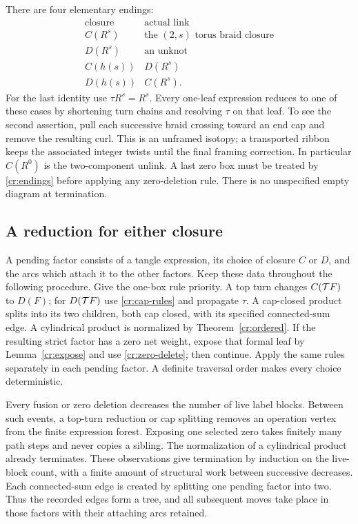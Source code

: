 There are four elementary endings:
\begin{equation}\label{cr:endings}
\begin{array}{c|c}
\text{closure}&\text{actual link}\\\hline
C(R^s)&\text{the }(2,s)\text{ torus braid closure}\\
D(R^s)&\text{an unknot}\\
C(h(s))&D(R^s)\\
D(h(s))&C(R^s).
\end{array}
\end{equation}
For the last identity use $\tau R^s=R^s$. Every one-leaf expression reduces to one of these cases by shortening turn chains and resolving $\tau$ on that leaf. To see the second assertion, pull each successive braid crossing toward an end cap and remove the resulting curl. This is an unframed isotopy; a transported ribbon keeps the associated integer twists until the final framing correction. In particular $C(R^0)$ is the two-component unlink. A last zero box must be treated by \eqref{cr:endings} before applying any zero-deletion rule. There is no unspecified empty diagram at termination.

\subsection{A reduction for either closure}

A pending factor consists of a tangle expression, its choice of
closure $C$ or $D$, and the arcs which attach it to the other factors.
Keep these data throughout the following procedure. Give the one-box rule priority. A top turn changes $C(\mathcal T F)$ to $D(F)$; for $D(\mathcal T F)$ use \eqref{cr:cap-rules} and propagate $\tau$. A cap-closed product splits into its two children, both cap closed, with its specified connected-sum edge. A cylindrical product is normalized by Theorem~\ref{cr:ordered}. If the resulting strict factor has a zero net weight, expose that formal leaf by Lemma~\ref{cr:expose} and use \eqref{cr:zero-delete}; then continue. Apply the same rules separately in each pending factor. A definite traversal order makes every choice deterministic.

Every fusion or zero deletion decreases the number of live label blocks. Between such events, a top-turn reduction or cap splitting removes an operation vertex from the finite expression forest. Exposing one selected zero takes finitely many path steps and never copies a sibling. The normalization of a cylindrical product already terminates. These observations give termination by induction on the live-block count, with a finite amount of structural work between successive decreases. Each connected-sum edge is created by splitting one pending factor into two. Thus the recorded edges form a tree, and all subsequent moves take place in those factors with their attaching arcs retained.

